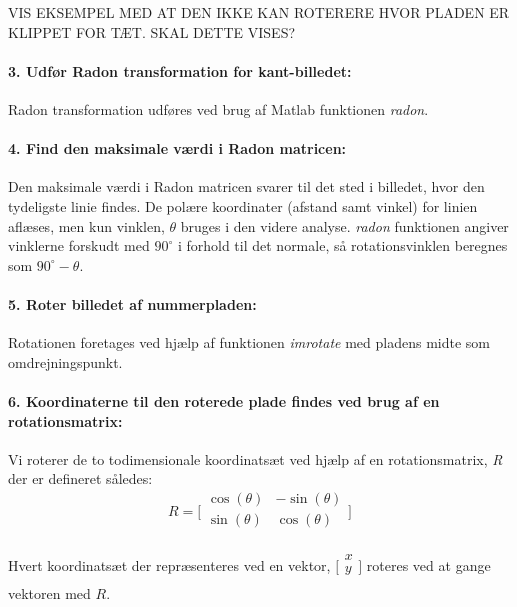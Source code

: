 VIS EKSEMPEL MED AT DEN IKKE KAN ROTERERE HVOR PLADEN ER KLIPPET FOR TÆT. SKAL DETTE VISES?

\paragraph{3. Udfør Radon transformation for kant-billedet:} Radon transformation udføres ved brug af Matlab funktionen \textit{radon}.

\paragraph{4. Find den maksimale værdi i Radon matricen:} Den maksimale værdi i Radon matricen svarer til det sted i billedet, hvor den tydeligste linie findes. De polære koordinater (afstand samt vinkel) for linien aflæses, men kun vinklen, $\theta$ bruges i den videre analyse. \textit{radon} funktionen angiver vinklerne forskudt med $90^{\circ}$ i forhold til det normale, så rotationsvinklen beregnes som $90^{\circ} - \theta$.

\paragraph{5. Roter billedet af nummerpladen:} Rotationen foretages ved hjælp af funktionen \textit{imrotate} med pladens midte som omdrejningspunkt.

\paragraph{6. Koordinaterne til den roterede plade findes ved brug af en rotationsmatrix:} Vi roterer de to todimensionale koordinatsæt ved hjælp af en rotationsmatrix, \textit{R} der er defineret således:
\begin{displaymath} 
R = 
\biggl[ \begin{array}{cc} 
\cos(\theta) & - \sin(\theta) \\
\sin(\theta) & \cos(\theta) \\
\end{array} \biggr] 
\end{displaymath}

Hvert koordinatsæt der repræsenteres ved en vektor, $\biggl[\begin{array}{c} x\\ y\\ \end{array}\biggr]$ roteres ved at gange vektoren med $R$.

